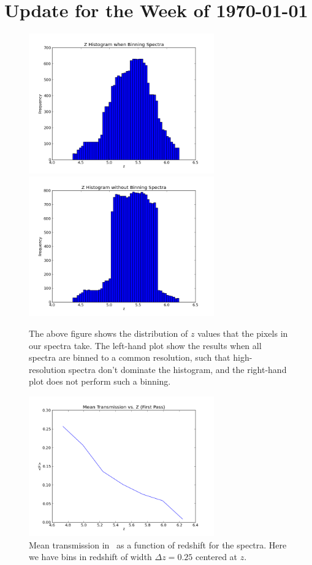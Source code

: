 \documentclass[11pt]{article}
\begin{document}
\section*{Update for the Week of \today}


\begin{figure}[h]
  \centering
  \includegraphics[width=8cm]{zHist_binned.png}
  \includegraphics[width=8cm]{zHist_unbinned.png}
  \caption{The above figure shows the distribution of $z$ values that the pixels in our spectra take. The left-hand plot show the results when all spectra are binned to a common resolution, such that high-resolution spectra don't dominate the histogram, and the right-hand plot does not perform such a binning.}
  \label{fig:todo}
\end{figure}

\begin{figure}[h]
  \centering
  \includegraphics[width=8cm]{FvsZ.png}
  \caption{Mean transmission in \lya\ as a function of redshift for the spectra. Here we have bins in redshift of width $\Delta z = 0.25$ centered at $z$.}
  \label{fig:todo}
\end{figure}
\end{document}
